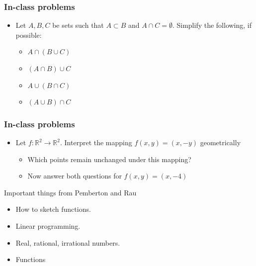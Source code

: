 \documentclass[aspectratio=169, handout]{beamer}
\numberwithin{equation}{section}
\begin{document}
\begin{frame}
\frametitle{In-class problems}

\begin{itemize}

\item[3.1.2] Let $A, B, C$ be sets such that $A\subset B$ and $A\cap C=\emptyset$.  Simplify the following, if possible:

\begin{itemize}
\item $A\cap(B\cup C)$ %
\item $(A\cap B)\cup C$ %
\item $A\cup(B\cap C)$ %
\item $(A\cup B)\cap C$ %


\end{itemize}

\end{itemize}
\end{frame}


\begin{frame}
\frametitle{In-class problems}

\begin{itemize}
\item Let $f:\mathbb{R}^2\rightarrow \mathbb{R}^2$. Interpret the mapping $f(x, y)=(x, -y)$ geometrically
\begin{itemize}

\item Which points remain unchanged under this mapping? %

\item Now answer both questions for $f(x, y)=(x, -4)$ %

\end{itemize}
\end{itemize}

\end{frame}

\begin{frame}{Important things from Pemberton and Rau}

\begin{itemize}

\item How to sketch functions.
\item Linear programming.
\item Real, rational, irrational numbers.
\item \textcolor{myblack}{Functions}
\end{itemize}

\end{frame}
\end{document}
